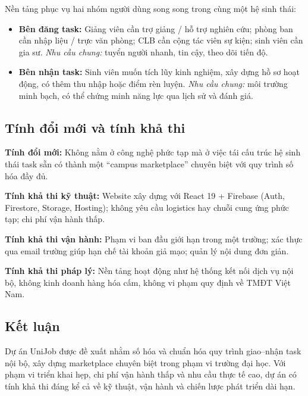 Nền tảng phục vụ hai nhóm người dùng song song trong cùng một hệ sinh thái:

\begin{itemize}
  \item \textbf{Bên đăng task:} Giảng viên cần trợ giảng / hỗ trợ nghiên cứu; phòng ban cần
    nhập liệu / trực văn phòng; CLB cần cộng tác viên sự kiện; sinh viên cần gia sư.
    \textit{Nhu cầu chung:} tuyển người nhanh, tin cậy, theo dõi tiến độ.

  \item \textbf{Bên nhận task:} Sinh viên muốn tích lũy kinh nghiệm, xây dựng hồ sơ hoạt động,
    có thêm thu nhập hoặc điểm rèn luyện.
    \textit{Nhu cầu chung:} môi trường minh bạch, có thể chứng minh năng lực qua lịch sử
    và đánh giá.
\end{itemize}

\subsection{Tính đổi mới và tính khả thi}

\textbf{Tính đổi mới:} Không nằm ở công nghệ phức tạp mà ở việc tái cấu trúc hệ sinh thái
task sẵn có thành một ``campus marketplace'' chuyên biệt với quy trình số hóa đầy đủ.

\textbf{Tính khả thi kỹ thuật:} Website xây dựng với React 19 + Firebase (Auth, Firestore,
Storage, Hosting); không yêu cầu logistics hay chuỗi cung ứng phức tạp; chi phí vận hành thấp.

\textbf{Tính khả thi vận hành:} Phạm vi ban đầu giới hạn trong một trường; xác thực qua email
trường giúp hạn chế tài khoản giả mạo; quản lý nội dung đơn giản.

\textbf{Tính khả thi pháp lý:} Nền tảng hoạt động như hệ thống kết nối dịch vụ nội bộ, không
kinh doanh hàng hóa cấm, không vi phạm quy định về TMĐT Việt Nam.

\subsection{Kết luận}

Dự án UniJob được đề xuất nhằm số hóa và chuẩn hóa quy trình giao--nhận task nội bộ, xây
dựng marketplace chuyên biệt trong phạm vi trường đại học. Với phạm vi triển khai hẹp, chi
phí vận hành thấp và nhu cầu thực tế cao, dự án có tính khả thi đáng kể cả về kỹ thuật, vận
hành và chiến lược phát triển dài hạn.
